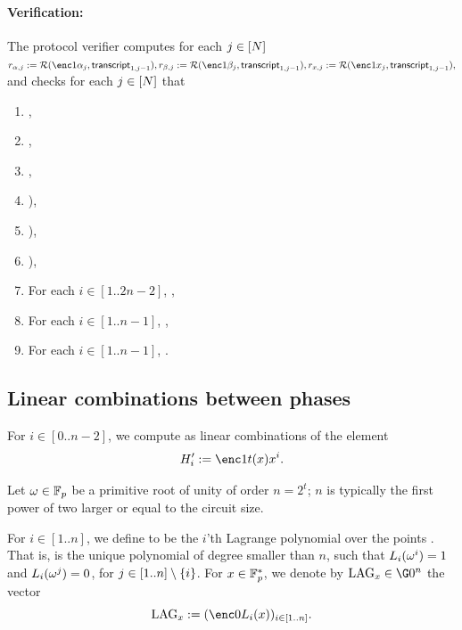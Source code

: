 \documentclass{article}
\begin{document}
\paragraph{Verification:}

The protocol verifier computes for each $j\in [N]$
$ r_{\alpha,j}\defeq \RO(\enc1{\alpha_j},\transcript_{1,j-1}),r_{\beta,j}\defeq \RO(\enc1{\beta_j},\transcript_{1,j-1}), r_{x,j}\defeq \RO(\enc1{x_j},\transcript_{1,j-1}),
$
and checks for each $j\in[N]$ that
\begin{enumerate}
  \item {},
  \item {},
  \item {},
\item {}),
\item {}),
\item {}),
  \item For each $i\in [1..2n-2]$, ,
 \item For each $i\in [1..n-1]$, ,
 \item For each $i\in [1..n-1]$, .
 
\end{enumerate}

\subsection{Linear combinations between phases}\label{subsec:fft}

For $i\in [0..n-2]$, we compute as linear combinations of 
the element
\[H'_i\defeq \enc1{t(x)x^i}.\]



Let $\omega\in {\mathbb F}_p$ be a primitive root of unity of order $n=2^{t}$; $n$ is typically the first power of two larger or equal to the circuit size.

For $i\in [1..n]$, we define  to be the $i$'th Lagrange polynomial over the points .
That is,  is the unique polynomial of degree smaller than $n$, such that
$L_{i}(\omega^i)=1$ and $L_{i}(\omega^j)=0$, for $j\in [1..n]\setminus \left\{i\right\}$.
For $x\in {\mathbb F}_p^*$, 
we denote by $\lagvec{x}\in \G0^{n}$ the vector 
\[\lagvec{x}\defeq \vecc{\enc0{\lag{i}(x)}}{i\in [1..n]}.\]
\end{document}

